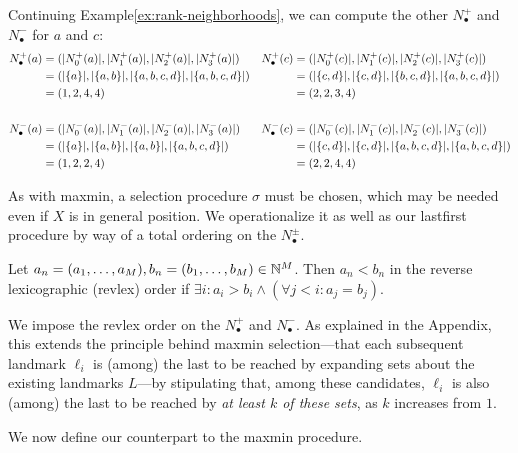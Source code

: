 \documentclass{article}
\begin{document}
\begin{example}\label{ex:rank-sequence}
Continuing Example\nbs\ref{ex:rank-neighborhoods}, we can compute the other $N_\bullet^+$ and $N_\bullet^-$ for $a$ and $c$:
\begin{align*}
    N_\bullet^+ (a) &= (\lvert N^+_0(a)\rvert, \lvert N^+_1(a)\rvert, \lvert N^+_2(a)\rvert, \lvert N^+_3(a)\rvert) &
    N_\bullet^+ (c) &= (\lvert N^+_0(c)\rvert, \lvert N^+_1(c)\rvert, \lvert N^+_2(c)\rvert, \lvert N^+_3(c)\rvert) \\
    &= (\lvert \{a\}\rvert, \lvert \{a, b\}\rvert, \lvert \{a, b, c, d\}\rvert, \lvert \{a, b, c, d\}\rvert) &
    &= (\lvert \{c, d\}\rvert, \lvert \{c, d\}\rvert, \lvert \{b, c, d\}\rvert, \lvert \{a, b, c, d\}\rvert) \\
    &= (1, 2, 4, 4) &
    &= (2, 2, 3, 4) \\
    \\
    N_\bullet^- (a) &= (\lvert N^-_0(a)\rvert, \lvert N^-_1(a)\rvert, \lvert N^-_2(a)\rvert, \lvert N^-_3(a)\rvert) &
    N_\bullet^- (c) &= (\lvert N^-_0(c)\rvert, \lvert N^-_1(c)\rvert, \lvert N^-_2(c)\rvert, \lvert N^-_3(c)\rvert) \\
    &= (\lvert \{a\}\rvert, \lvert \{a, b\}\rvert, \lvert \{a, b\}\rvert, \lvert \{a, b, c, d\}\rvert) &
    &= (\lvert \{c, d\}\rvert, \lvert \{c, d\}\rvert, \lvert \{a, b, c, d\}\rvert, \lvert \{a, b, c, d\}\rvert) \\
    &= (1, 2, 2, 4) &
    &= (2, 2, 4, 4)
\end{align*}
\end{example}

As with maxmin, a selection procedure \(\sigma\) must be chosen, which
may be needed even if \(X\) is in general position. We operationalize it
as well as our lastfirst procedure by way of a total ordering on the
\(N^\pm_\bullet\).

\begin{definition}
    Let $a_n = (a_1,\ldots,a_M),b_n = (b_1,\ldots,b_M)\in\mathbb{N}^M$.
    Then $a_n < b_n$ in the reverse lexicographic (revlex) order if $\exists i : a_i > b_i \wedge (\forall j<i : a_j = b_j)$.
\end{definition}

We impose the revlex order on the \(N_\bullet^+\) and \(N_\bullet^-\).
As explained in the Appendix, this extends the principle behind maxmin
selection---that each subsequent landmark \(\ell_i\) is (among) the last
to be reached by expanding sets about the existing landmarks \(L\)---by
stipulating that, among these candidates, \(\ell_i\) is also (among) the
last to be reached by \emph{at least \(k\) of these sets}, as \(k\)
increases from \(1\).

We now define our counterpart to the maxmin procedure.
\end{document}
